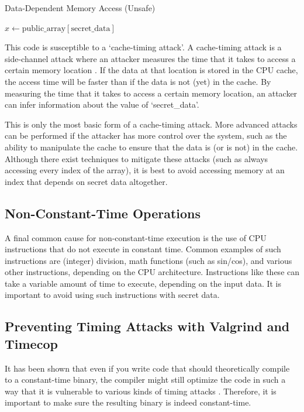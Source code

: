 \documentclass[11pt,a4paper]{report}
\theoremstyle{definition}
\begin{document}
\begin{algorithm}
  \caption{Data-Dependent Memory Access (Unsafe)}
  \label{alg:datadependentmemoryaccess}
  \begin{algorithmic}[1]
    \State $x \gets \text{public\_array}[\text{secret\_data}]$
  \end{algorithmic}
\end{algorithm}

This code is susceptible to a `cache-timing attack'. A cache-timing attack is a side-channel attack where an attacker measures the time that it takes to access a certain memory location \cite{kocher1996timing, bernstein2005cache}. If the data at that location is stored in the CPU cache, the access time will be faster than if the data is not (yet) in the cache. By measuring the time that it takes to access a certain memory location, an attacker can infer information about the value of `secret\_data'.

This is only the most basic form of a cache-timing attack. More advanced attacks can be performed if the attacker has more control over the system, such as the ability to manipulate the cache to ensure that the data is (or is not) in the cache. Although there exist techniques to mitigate these attacks (such as always accessing every index of the array), it is best to avoid accessing memory at an index that depends on secret data altogether.

\subsection{Non-Constant-Time Operations}
\label{sec:nonconstanttimeoperations}
A final common cause for non-constant-time execution is the use of CPU instructions that do not execute in constant time. Common examples of such instructions are (integer) division, math functions (such as sin/cos), and various other instructions, depending on the CPU architecture. Instructions like these can take a variable amount of time to execute, depending on the input data. It is important to avoid using such instructions with secret data.

\subsection{Preventing Timing Attacks with Valgrind and Timecop}
\label{sec:valgrindtimecop}
It has been shown that even if you write code that should theoretically compile to a constant-time binary, the compiler might still optimize the code in such a way that it is vulnerable to various kinds of timing attacks \cite{simon2018you, barthe2019formal}. Therefore, it is important to make sure the resulting binary is indeed constant-time.
\end{document}
